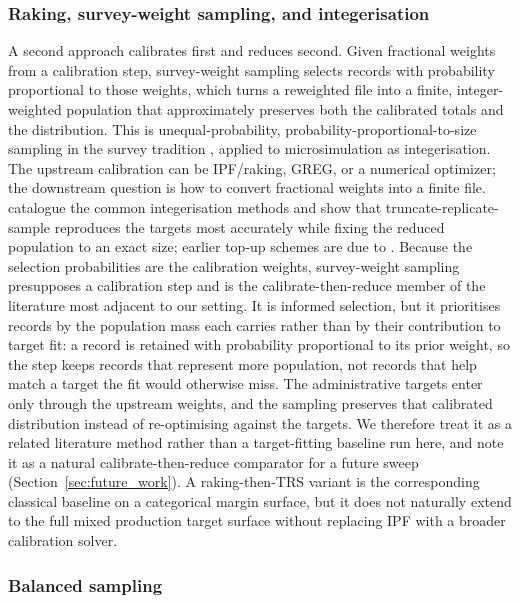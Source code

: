 \subsubsection{Raking, survey-weight sampling, and integerisation}

A second approach calibrates first and reduces second. Given fractional weights from a calibration
step, survey-weight sampling selects records with probability proportional to those weights, which
turns a reweighted file into a finite, integer-weighted population that approximately preserves both
the calibrated totals and the distribution. This is unequal-probability,
probability-proportional-to-size sampling in the survey tradition \citep{hansen1943, horvitz1952},
applied to microsimulation as integerisation. The upstream calibration can be IPF/raking, GREG, or a
numerical optimizer; the downstream question is how to convert fractional weights into a finite file.
\citet{lovelace2013trs} catalogue the common integerisation methods and show that
truncate-replicate-sample reproduces the targets most accurately while fixing the reduced population
to an exact size; earlier top-up schemes are due to \citet{ballas2005}. Because the selection
probabilities are the calibration weights, survey-weight sampling presupposes a calibration step and is
the calibrate-then-reduce member of the literature most adjacent to our setting. It is informed
selection, but it prioritises records by the population mass each carries rather than by their
contribution to target fit: a record is retained with probability proportional to its prior weight, so
the step keeps records that represent more population, not records that help match a target the fit would
otherwise miss. The administrative targets enter only through the upstream weights, and the sampling
preserves that calibrated distribution instead of re-optimising against the targets. We therefore treat
it as a related literature method rather than a
target-fitting baseline run here, and note it as a natural calibrate-then-reduce comparator for a future
sweep (Section~\ref{sec:future_work}). A raking-then-TRS variant is the corresponding classical baseline
on a categorical margin surface, but it does not naturally extend to the full mixed production target
surface without replacing IPF with a broader calibration solver.

\subsubsection{Balanced sampling}

